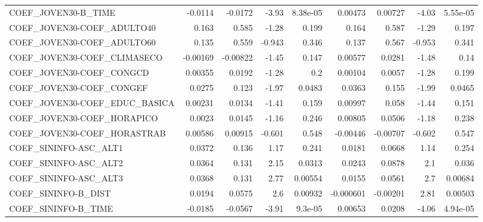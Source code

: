 \begin{tabular}{lrrrrrrrr}
COEF\_JOVEN30-B\_TIME               &     -0.0114 &      -0.0172 &   -3.93 & 8.38e-05 &    0.00473 &     0.00727 &        -4.03 &      5.55e-05 \\
COEF\_JOVEN30-COEF\_ADULTO40        &       0.163 &        0.585 &   -1.28 &    0.199 &      0.164 &       0.587 &        -1.29 &         0.197 \\
COEF\_JOVEN30-COEF\_ADULTO60        &       0.135 &        0.559 &  -0.943 &    0.346 &      0.137 &       0.567 &       -0.953 &         0.341 \\
COEF\_JOVEN30-COEF\_CLIMASECO       &    -0.00169 &     -0.00822 &   -1.45 &    0.147 &    0.00577 &      0.0281 &        -1.48 &          0.14 \\
COEF\_JOVEN30-COEF\_CONGCD          &     0.00355 &       0.0192 &   -1.28 &      0.2 &    0.00104 &      0.0057 &        -1.28 &         0.199 \\
COEF\_JOVEN30-COEF\_CONGEF          &      0.0275 &        0.123 &   -1.97 &   0.0483 &     0.0363 &       0.155 &        -1.99 &        0.0465 \\
COEF\_JOVEN30-COEF\_EDUC\_BASICA     &     0.00231 &       0.0134 &   -1.41 &    0.159 &    0.00997 &       0.058 &        -1.44 &         0.151 \\
COEF\_JOVEN30-COEF\_HORAPICO        &      0.0023 &       0.0145 &   -1.16 &    0.246 &    0.00805 &      0.0506 &        -1.18 &         0.238 \\
COEF\_JOVEN30-COEF\_HORASTRAB       &     0.00586 &      0.00915 &  -0.601 &    0.548 &   -0.00446 &    -0.00707 &       -0.602 &         0.547 \\
COEF\_SININFO-ASC\_ALT1             &      0.0372 &        0.136 &    1.17 &    0.241 &     0.0181 &      0.0668 &         1.14 &         0.254 \\
COEF\_SININFO-ASC\_ALT2             &      0.0364 &        0.131 &    2.15 &   0.0313 &     0.0243 &      0.0878 &          2.1 &         0.036 \\
COEF\_SININFO-ASC\_ALT3             &      0.0368 &        0.131 &    2.77 &  0.00554 &     0.0155 &      0.0561 &          2.7 &       0.00684 \\
COEF\_SININFO-B\_DIST               &      0.0194 &       0.0575 &     2.6 &  0.00932 &  -0.000601 &    -0.00201 &         2.81 &       0.00503 \\
COEF\_SININFO-B\_TIME               &     -0.0185 &      -0.0567 &   -3.91 &  9.3e-05 &    0.00653 &      0.0208 &        -4.06 &      4.94e-05 \\

\end{tabular}
